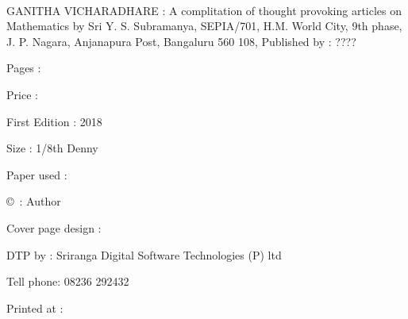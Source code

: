 ~
\thispagestyle{empty}

\noindent
{\rm GANITHA VICHARADHARE : A complitation of thought provoking articles on Mathematics by Sri Y. S. Subramanya, SEPIA/701, H.M. World City, 9th phase, J. P. Nagara, Anjanapura Post, Bangaluru 560 108, Published by : ????}

\bigskip

\noindent
{\rm Pages : }

\bigskip

\noindent
{\rm Price : }

\bigskip

\noindent
{\rm First Edition : 2018}

\bigskip

\noindent
{\rm Size : 1/8th Denny}

\bigskip

\noindent
{\rm Paper used : }

\bigskip

\noindent
{\rm \copyright ~: Author}

\medskip

\noindent
{\rm Cover page design : }

\medskip
\noindent
{\rm DTP by : Sriranga Digital Software Technologies (P) ltd}

\medskip
\noindent
{\rm Tell phone: 08236 292432}

\medskip
\noindent
{\rm Printed at : }

